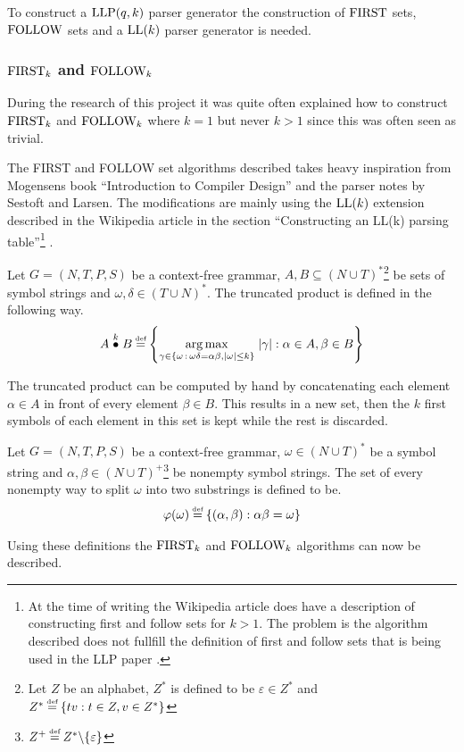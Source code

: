 To construct a $\text{LLP}(q,k)$ parser generator the construction of $\text{FIRST}$ sets, $\text{FOLLOW}$ sets \cite[5]{Vagner2007} and a $\text{LL}(k)$ parser generator is needed.

\subsubsection{\texorpdfstring{$\text{FIRST}_k$}{TEXT} and \texorpdfstring{$\text{FOLLOW}_k$}{TEXT}}
During the research of this project it was quite often explained how to construct $\text{FIRST}_k$ and $\text{FOLLOW}_k$ where $k = 1$ but never $k > 1$ since this was often seen as trivial.

The FIRST and FOLLOW set algorithms described takes heavy inspiration from Mogensens book ``Introduction to Compiler Design'' \cite[55-65]{Mogensen} and the parser notes \cite[10-15]{notes:parser} by Sestoft and Larsen. The modifications are mainly using the $\text{LL}(k)$ extension described in the Wikipedia article in the section ``Constructing an LL(k) parsing table''\footnote{At the time of writing the Wikipedia article does have a description of constructing first and follow sets for $k > 1$. The problem is the algorithm described does not fullfill the definition of first and follow sets that is being used in the LLP paper \cite[5]{Vagner2007}.} \cite{wiki:LL_parser}.

\begin{definition}
    Let $G = (N, T, P, S)$ be a context-free grammar, $A, B \subseteq (N \cup T)^*$\footnote{Let $Z$ be an alphabet, $Z^*$ is defined to be $\varepsilon \in Z^*$ and $Z^* \defeq \{tv : t \in Z, v \in Z^*\}$} be sets of symbol strings and $\omega, \delta \in (T \cup N)^*$. The truncated product is defined in the following way.
    \begin{gather*}
        A \truncprod{k} B \defeq \left\{\underset{\gamma \in \{\omega \, : \, \omega\delta = \alpha\beta, |\omega| \leq k\}}{\arg \max} \; |\gamma| : \alpha \in A, \beta \in B\right\}
    \end{gather*}
\end{definition}
\noindent The truncated product can be computed by hand by concatenating each element $\alpha \in A$ in front of every element $\beta \in B$. This results in a new set, then the $k$ first symbols of each element in this set is kept while the rest is discarded. 

\begin{definition}
    Let $G = (N, T, P, S)$ be a context-free grammar, $\omega \in (N \cup T)^*$ be a symbol string and $\alpha, \beta \in (N \cup T)^+$\footnote{$Z^+ \defeq Z^*\backslash \{\varepsilon\}$} be nonempty symbol strings. The set of every nonempty way to split $\omega$ into two substrings is defined to be.
    \begin{gather*}
        \varphi(\omega) \defeq \{(\alpha, \beta) : \alpha\beta = \omega\}
    \end{gather*}
\end{definition}
\noindent Using these definitions the $\text{FIRST}_k$ and $\text{FOLLOW}_k$ algorithms can now be described.

